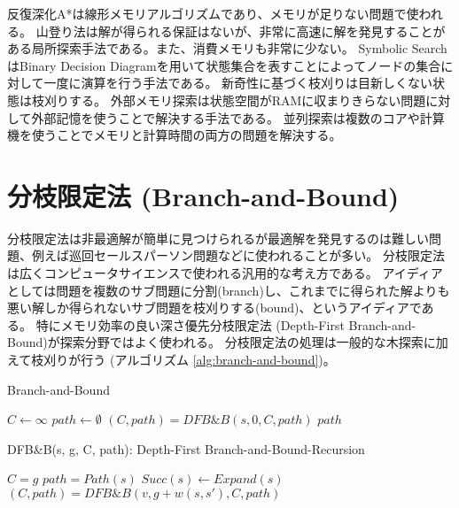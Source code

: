 反復深化A*は線形メモリアルゴリズムであり、メモリが足りない問題で使われる。
山登り法は解が得られる保証はないが、非常に高速に解を発見することがある局所探索手法である。また、消費メモリも非常に少ない。
Symbolic SearchはBinary Decision Diagramを用いて状態集合を表すことによってノードの集合に対して一度に演算を行う手法である。
新奇性に基づく枝刈りは目新しくない状態は枝刈りする。
外部メモリ探索は状態空間がRAMに収まりきらない問題に対して外部記憶を使うことで解決する手法である。
並列探索は複数のコアや計算機を使うことでメモリと計算時間の両方の問題を解決する。


\section{分枝限定法 (Branch-and-Bound)}
\label{sec:branch-and-bound}

分枝限定法は非最適解が簡単に見つけられるが最適解を発見するのは難しい問題、例えば巡回セールスパーソン問題などに使われることが多い。
分枝限定法は広くコンピュータサイエンスで使われる汎用的な考え方である。
アイディアとしては問題を複数のサブ問題に分割(branch)し、これまでに得られた解よりも悪い解しか得られないサブ問題を枝刈りする(bound)、というアイディアである。
特にメモリ効率の良い深さ優先分枝限定法 (Depth-First Branch-and-Bound)が探索分野ではよく使われる。
分枝限定法の処理は一般的な木探索に加えて枝刈りが行う (アルゴリズム \ref{alg:branch-and-bound})。

\begin{algorithm}
\caption{Branch-and-Bound}
\label{alg:branch-and-bound}
	$C \leftarrow \infty$
	$path \leftarrow \emptyset$
	$(C, path) = DFB\&B(s, 0, C, path)$
	\Return $path$\;
\end{algorithm}

\begin{algorithm}
\caption{DFB\&B(s, g, C, path): Depth-First Branch-and-Bound-Recursion}
\label{alg:branch-and-bound-rec}
	 {
		 {
			$C = g$\;
			$path = Path(s)$\;
		}
	}
	$Succ(s) \leftarrow Expand(s)$\;
	 {
		 {
			$(C, path) = DFB\&B(v, g + w(s, s'), C, path)$
		}
	}
\end{algorithm}

